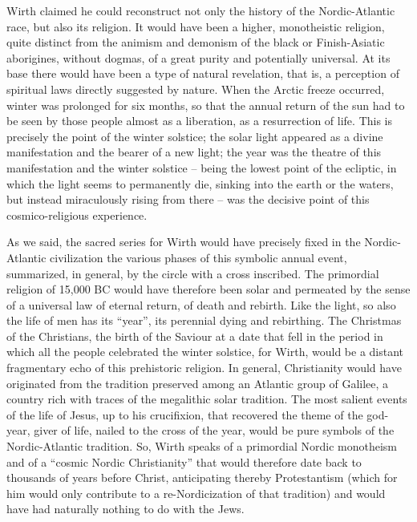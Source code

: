 \begin{quotationx}
Wirth claimed he could reconstruct not only the history of the Nordic-Atlantic race, but also its religion. It would have been a higher, monotheistic religion, quite distinct from the animism and demonism of the black or Finish-Asiatic aborigines, without dogmas, of a great purity and potentially universal. At its base there would have been a type of natural revelation, that is, a perception of spiritual laws directly suggested by nature. When the Arctic freeze occurred, winter was prolonged for six months, so that the annual return of the sun had to be seen by those people almost as a liberation, as a resurrection of life. This is precisely the point of the winter solstice; the solar light appeared as a divine manifestation and the bearer of a new light; the year was the theatre of this manifestation and the winter solstice -- being the lowest point of the ecliptic, in which the light seems to permanently die, sinking into the earth or the waters, but instead miraculously rising from there -- was the decisive point of this cosmico-religious experience.

As we said, the sacred series for Wirth would have precisely fixed in the Nordic-Atlantic civilization the various phases of this symbolic annual event, summarized, in general, by the circle with a cross inscribed. The primordial religion of 15,000 BC would have therefore been solar and permeated by the sense of a universal law of eternal return, of death and rebirth. Like the light, so also the life of men has its ``year'', its perennial dying and rebirthing. The Christmas of the Christians, the birth of the Saviour at a date that fell in the period in which all the people celebrated the winter solstice, for Wirth, would be a distant fragmentary echo of this prehistoric religion. In general, Christianity would have originated from the tradition preserved among an Atlantic group of Galilee, a country rich with traces of the megalithic solar tradition. The most salient events of the life of Jesus, up to his crucifixion, that recovered the theme of the god-year, giver of life, nailed to the cross of the year, would be pure symbols of the Nordic-Atlantic tradition. So, Wirth speaks of a primordial Nordic monotheism and of a ``cosmic Nordic Christianity'' that would therefore date back to thousands of years before Christ, anticipating thereby Protestantism (which for him would only contribute to a re-Nordicization of that tradition) and would have had naturally nothing to do with the Jews.


\end{quotationx}
